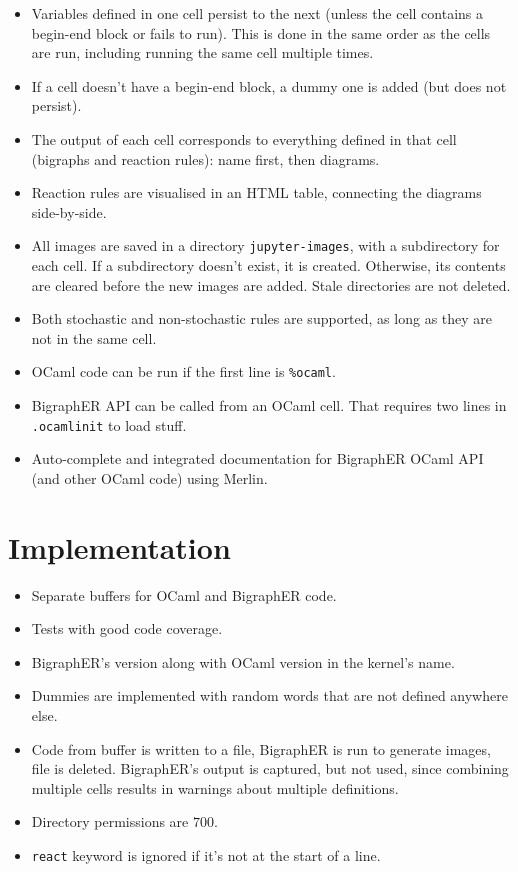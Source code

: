 \documentclass{article}
\begin{document}
\begin{itemize}
\item Variables defined in one cell persist to the next (unless the cell
  contains a begin-end block or fails to run). This is done in the same order as
  the cells are run, including running the same cell multiple times.
\item If a cell doesn't have a begin-end block, a dummy one is added (but does
  not persist).
\item The output of each cell corresponds to everything defined in that cell
  (bigraphs and reaction rules): name first, then diagrams.
\item Reaction rules are visualised in an HTML table, connecting the diagrams
  side-by-side.
\item All images are saved in a directory \texttt{jupyter-images}, with a
  subdirectory for each cell. If a subdirectory doesn't exist, it is created.
  Otherwise, its contents are cleared before the new images are added. Stale
  directories are not deleted.
\item Both stochastic and non-stochastic rules are supported, as long as they
  are not in the same cell.
\item OCaml code can be run if the first line is \texttt{\%ocaml}.

\item BigraphER API can be called from an OCaml cell. That requires two lines in
  \texttt{.ocamlinit} to load stuff.
\item Auto-complete and integrated documentation for BigraphER OCaml API (and
  other OCaml code) using Merlin.
\end{itemize}

\section{Implementation}

\begin{itemize}
\item Separate buffers for OCaml and BigraphER code.
\item Tests with good code coverage.
\item BigraphER's version along with OCaml version in the kernel's name.
\item Dummies are implemented with random words that are not defined anywhere else.
\item Code from buffer is written to a file, BigraphER is run to generate
  images, file is deleted. BigraphER's output is captured, but not used, since
  combining multiple cells results in warnings about multiple definitions.
\item Directory permissions are $700$.
\item \texttt{react} keyword is ignored if it's not at the start of a line.
\end{itemize}
\end{document}
